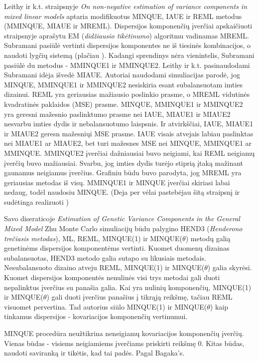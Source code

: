 \documentclass[12pt,a4paper]{article}
\begin{document}
\indent Leithy ir k.t. straipsnyje \textit{On non-negative estimation of variance components in mixed linear models} \cite{MMINQUE} aptaria  modifikuotus MINQUE, IAUE ir REML metodus (MMINQUE, MIAUE ir MREML). Dispersijos komponenčių įverčiai apskaičiuoti straipsnyje aprašytu EM (\textit{didžiausio tikėtinumo}) algoritmu vadinamas MREML. Subramani \cite{MMIVQUE} pasiūlė vertinti dispersijos komponentes ne iš tiesinės kombinacijos, o naudoti lygčių sistemą (plačiau \cite{MMINQUE}). Kadangi sprendinys nėra vienintelis, Subramani pasiūlė du metodus - MMINQUE1 ir MMINQUE2. Leithy ir k.t. pasinaudodami Subramani idėja išvedė MIAUE. Autoriai naudodami simuliacijas parodė, jog MINQUE, MMINQUE1 ir MMINQUE2 nesiskiria esant subalansuotam imties dizainui. REML yra geriausias mažiausio poslinkio prasme, o MREML vidutinės kvadratinės paklaidos (MSE) prasme. MINQUE, MMINQUE1 ir MMINQUE2 yra geresni mažesnio paslinktumo prasme nei IAUE, MIAUE1 ir MIAUE2 nesvarbu imties dydis ir nebalansuotumo laispsnis. Ir atvirkščiai, IAUE, MIAUE1 ir MIAUE2 geresn mažesniųi MSE prasme. IAUE visais atvejais labiau paslinktas nei MIAUE1 ar MIAUE2, bet turi mažesnes MSE nei MINQUE, MMINQUE1 ar MMINQUE. MMINQUE2 įverčiai dažniausiai buvo neigiami, kai REML neigiamų įverčių buvo mažiausiai. Svarbu, jog imties dydis turėjo stiprią įtaką mažinant gaunamus neigiamus įverčius. Grafiniu būdu buvo parodyta, jog MREML yra geriausias metodas iš visų. MMINQUE1 ir MINQUE įverčiai skiriasi labai nedaug, todėl naudosiu MINQUE. (Deja per vėlai pastebėjau šitą straipsnį ir sudėtinga realizuoti )

Savo diseraticoje \textit{Estimation of Genetic Variance Components in the General Mixed Model}\cite{zhu} Zhu Monte Carlo simuliacijų būdu palygino HEND3 (\textit{Henderono trečiasis metodas}), ML, REML, MINQUE(1) ir MINQUE($\theta$) metodų galią genetinėms dispersijos komponentėms vertinti. Kuomet duomenų dizainas subalansuotas, HEND3 metodo galia sutapo su likusiais metodais. Nesubalansuoto dizaino atveju REML, MINQUE(1) ir MINQUE($\theta$) galia skyrėsi. Kuomet dispersijos komponentės nenulinės visi trys metodai gali duoti nepalinktus įverčius su panašia galia. Kai yra nulinių komponenčių, MINQUE(1) ir MINQUE($\theta$) gali duoti įverčius panašius į tikrąją reikšmę, tačiau REML visuomet pervertina. Tad autorius siūlo MINQUE(1) ir MINQUE($\theta$) kaip tinkamus dispersijos - kovariacijos komponenčių vertinumui.


\indent MINQUE procedūra neužtikrina neneigiamų kovariacijos komponenčių įverčių. Vienas būdas - visiems neigiamiems įverčiams priskirti reikšmę 0. Kitas būdas, naudoti saviranką ir tikėtis, kad tai padės. Pagal Bagaka's.
\end{document}
